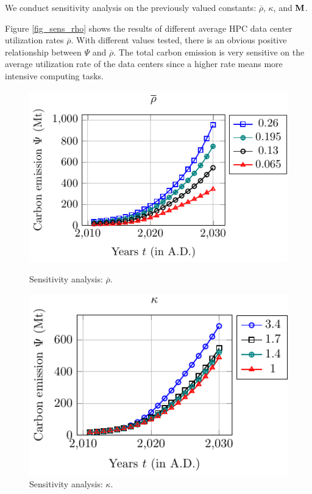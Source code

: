 \documentclass[12pt]{article}
\begin{document}
We conduct sensitivity analysis on the previously valued constants: $\overline{\rho}$, $\kappa$, and $\vb{M}$.

Figure \ref{fig_sens_rho} shows the results of different average HPC data center utilization rates $\overline{\rho}$. With different values tested, there is an obvious positive relationship between $\Psi$ and $\overline{\rho}$. The total carbon emission is very sensitive on the average utilization rate of the data centers since a higher rate means more intensive computing tasks.

\begin{figure}[!t]
	\centering
	\begin{minipage}{0.48\textwidth}
		\centering
		\includegraphics{figures/sensitivity/rho.pdf}
		\caption{Sensitivity analysis: $\overline{\rho}$.}
		\label{fig_sens_rho}
	\end{minipage}
	\begin{minipage}{0.48\textwidth}
		\centering
		\includegraphics{figures/sensitivity/kappa.pdf}
		\caption{Sensitivity analysis: $\kappa$.}
		\label{fig_sens_kappa}
	\end{minipage}
\end{figure}
\end{document}
